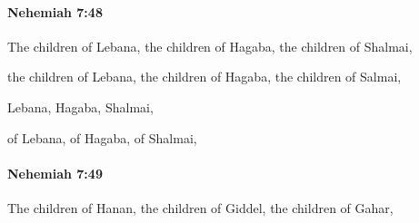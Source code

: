 		\paragraph{Nehemiah 7:48} %
			\label{NEHEMIAH-7-48}

			The children of Lebana, the children of Hagaba, the children of Shalmai,

			\begin{versebox}
					\item[BHS] 
					\item[LXX] 
					\item[ASV] the children of Lebana, the children of Hagaba, the children of Salmai,
					\item[NIV] Lebana, Hagaba, Shalmai,
					\item[NRSV] of Lebana, of Hagaba, of Shalmai,
			\end{versebox}

		\paragraph{Nehemiah 7:49} %
			\label{NEHEMIAH-7-49}

			The children of Hanan, the children of Giddel, the children of Gahar,

